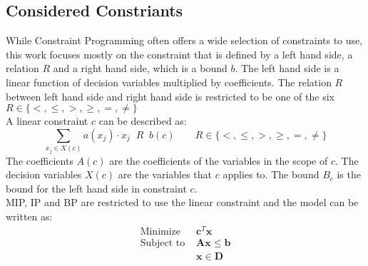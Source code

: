 \subsection{Considered Constriants }
While Constraint Programming often offers a wide selection of constraints to use, this work focuses mostly on the 
constraint \Linear that is defined by a left hand side, a relation $R$ and a 
right hand side, which is a bound $b$. The left hand side is a linear function of decision variables 
multiplied by coefficients. The relation $R$ between left hand side and right hand side is restricted to be one of 
the six $R \in \{<,\leq,>,\geq,=,\neq\}$ \\
A linear constraint $c$ can be described as: 
\begin{equation}
 \sum\limits_{x_j \in X(c)} a(x_j) \cdot x_j \;\; R \;\; b(c) \qquad R \in \{<,\leq,>,\geq,=,\neq\}%
\end{equation}
The coefficients $A(c)$ are the coefficients of the variables in the scope of $c$. The decision variables $X(c)$ are 
the variables that $c$ applies to. The bound $B_c$ is the bound for the left hand side in constraint $c$. \\
MIP, IP and BP are restricted to use the linear constraint and the model can be written as: 
\begin{align}
 \text{Minimize } & \mathbf{c}^T\mathbf{x} \nonumber \\ 
 \text{Subject to } &\mathbf{Ax} \leq \mathbf{b} \nonumber\\
 &\mathbf{x} \in \mathbf{D}
\end{align}







